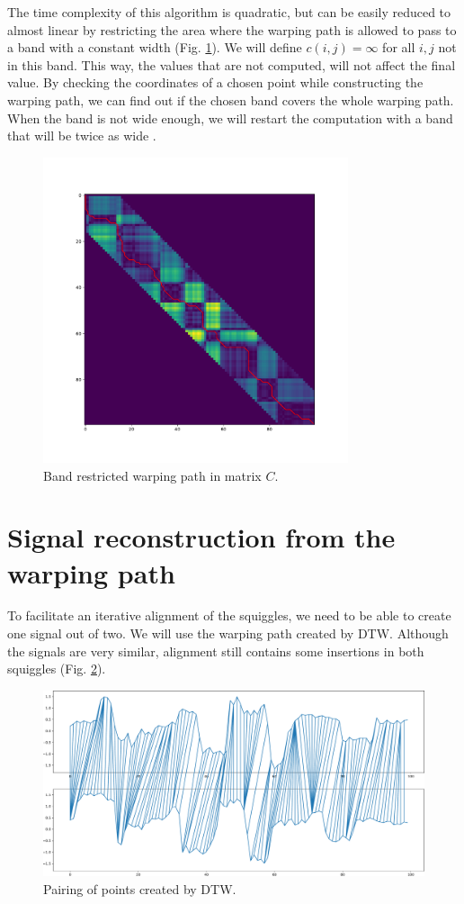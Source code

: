 The time complexity of this algorithm is quadratic, but can be easily reduced to almost linear by restricting the area where the warping path is allowed to pass to a band with a constant width (Fig. \ref{fig:belt}). We will define $c(i,j)=\infty$ for all $i,j$ not in this band. This way, the values that are not computed, will not affect the final value. By checking the coordinates of a chosen point while constructing the warping path, we can find out if the chosen band covers the whole warping path. 
When the band is not wide enough, we will restart the computation with a band that will be twice as wide \cite{band}.
\begin{figure}[h]
  \centering
  \includegraphics[width=0.8\textwidth]{images/wp2}
  \caption{Band restricted warping path in matrix $C$.}
  \label{fig:belt}
\end{figure}


\section{Signal reconstruction from the warping path}

To facilitate an iterative alignment of the squiggles, we need to be able to create one signal out of two. We will use the warping path created by DTW.
Although the signals are very similar, alignment still contains some insertions in both squiggles (Fig. \ref{fig:pairing}). 

\begin{figure}
  \centering
  \includegraphics[width=1.0\textwidth]{images/ciary}
  \caption{Pairing of points created by DTW.}
  \label{fig:pairing}
\end{figure}

